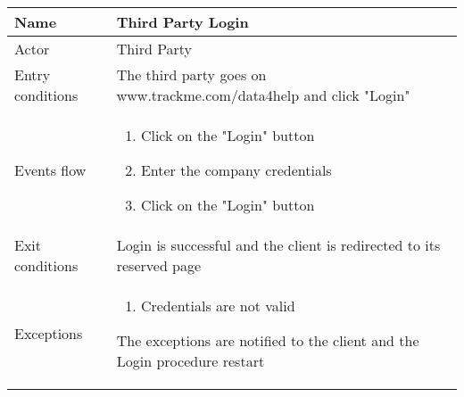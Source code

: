 \begin{table}[h!]
\begin{tabular}{|l|p{12cm}|}
\hline
Name             & Third Party Login \\ \hline
Actor            & Third Party \\ \hline
Entry conditions & The third party goes on www.trackme.com/data4help and click "Login" \\ \hline
Events flow      & \begin{enumerate}
\item Click on the "Login" button
\item Enter the company credentials
\item Click on the "Login" button
\end{enumerate} \\ \hline
Exit conditions  & Login is successful and the client is redirected to its reserved page  \\ \hline
Exceptions       & \begin{enumerate}
\item Credentials are not valid
\end{enumerate} The exceptions are notified to the client and the Login procedure restart  \\ \hline
\end{tabular}
\end{table}

